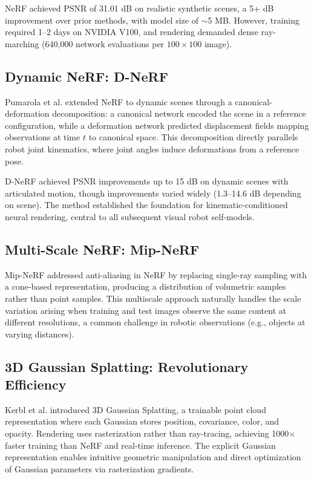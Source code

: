 \documentclass[journal]{IEEEtran}
\begin{document}
NeRF achieved PSNR of 31.01 dB on realistic synthetic scenes, a 5+ dB improvement over prior methods, with model size of $\sim$5 MB. However, training required 1--2 days on NVIDIA V100, and rendering demanded dense ray-marching (640,000 network evaluations per $100 \times 100$ image).

\subsection{Dynamic NeRF: D-NeRF}

Pumarola et al. \cite{pumarola2021} extended NeRF to dynamic scenes through a canonical-deformation decomposition: a canonical network encoded the scene in a reference configuration, while a deformation network predicted displacement fields mapping observations at time $t$ to canonical space. This decomposition directly parallels robot joint kinematics, where joint angles induce deformations from a reference pose.

D-NeRF achieved PSNR improvements up to 15 dB on dynamic scenes with articulated motion, though improvements varied widely (1.3--14.6 dB depending on scene). The method established the foundation for kinematic-conditioned neural rendering, central to all subsequent visual robot self-models.

\subsection{Multi-Scale NeRF: Mip-NeRF}

Mip-NeRF \cite{mipnerf2021} addressed anti-aliasing in NeRF by replacing single-ray sampling with a cone-based representation, producing a distribution of volumetric samples rather than point samples. This multiscale approach naturally handles the scale variation arising when training and test images observe the same content at different resolutions, a common challenge in robotic observations (e.g., objects at varying distances).

\subsection{3D Gaussian Splatting: Revolutionary Efficiency}

Kerbl et al. \cite{3dgs2023} introduced 3D Gaussian Splatting, a trainable point cloud representation where each Gaussian stores position, covariance, color, and opacity. Rendering uses rasterization rather than ray-tracing, achieving 1000$\times$ faster training than NeRF and real-time inference. The explicit Gaussian representation enables intuitive geometric manipulation and direct optimization of Gaussian parameters via rasterization gradients.
\end{document}
